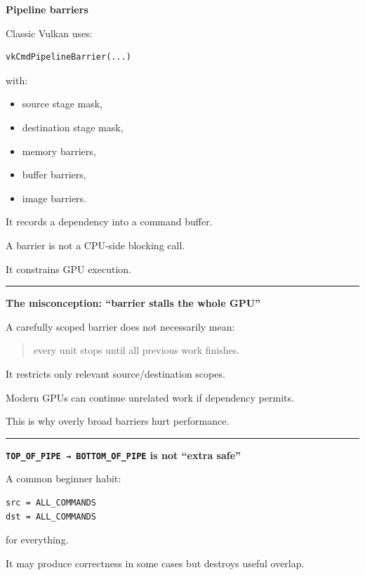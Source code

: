\textbf{Pipeline barriers}

Classic Vulkan uses:

\begin{verbatim}
vkCmdPipelineBarrier(...)
\end{verbatim}

with:

\begin{itemize}
\tightlist
\item
  source stage mask,
\item
  destination stage mask,
\item
  memory barriers,
\item
  buffer barriers,
\item
  image barriers.
\end{itemize}

It records a dependency into a command buffer.

A barrier is not a CPU-side blocking call.

It constrains GPU execution.

\begin{center}\rule{0.5\linewidth}{0.5pt}\end{center}

\textbf{The misconception: ``barrier stalls the whole GPU''}

A carefully scoped barrier does not necessarily mean:

\begin{quote}
every unit stops until all previous work finishes.
\end{quote}

It restricts only relevant source/destination scopes.

Modern GPUs can continue unrelated work if dependency permits.

This is why overly broad barriers hurt performance.

\begin{center}\rule{0.5\linewidth}{0.5pt}\end{center}

\textbf{\texttt{TOP\_OF\_PIPE\ →\ BOTTOM\_OF\_PIPE} is not ``extra safe''}

A common beginner habit:

\begin{verbatim}
src = ALL_COMMANDS
dst = ALL_COMMANDS
\end{verbatim}

for everything.

It may produce correctness in some cases but destroys useful overlap.

